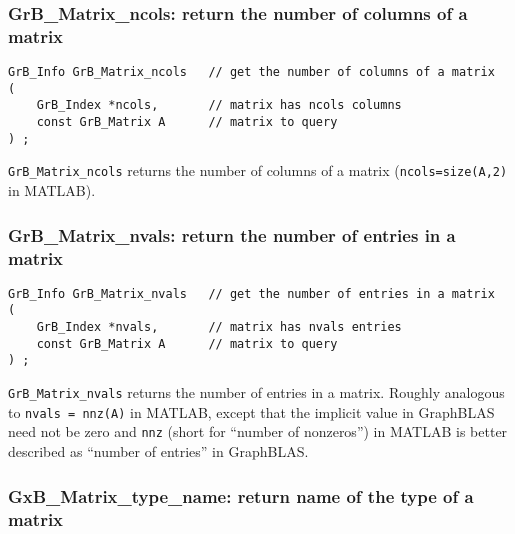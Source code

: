 \documentclass[12pt]{article}
\begin{document}
\subsubsection{{\sf GrB\_Matrix\_ncols:}        return the number of columns of a matrix}
\label{matrix_ncols}

\begin{mdframed}[userdefinedwidth=6in]
{\footnotesize
\begin{verbatim}
GrB_Info GrB_Matrix_ncols   // get the number of columns of a matrix
(
    GrB_Index *ncols,       // matrix has ncols columns
    const GrB_Matrix A      // matrix to query
) ;
\end{verbatim}
} \end{mdframed}

\verb'GrB_Matrix_ncols' returns the number of columns of a matrix
(\verb'ncols=size(A,2)' in MATLAB).

\subsubsection{{\sf GrB\_Matrix\_nvals:}        return the number of entries in a matrix}
\label{matrix_nvals}

\begin{mdframed}[userdefinedwidth=6in]
{\footnotesize
\begin{verbatim}
GrB_Info GrB_Matrix_nvals   // get the number of entries in a matrix
(
    GrB_Index *nvals,       // matrix has nvals entries
    const GrB_Matrix A      // matrix to query
) ;
\end{verbatim} } \end{mdframed}

\verb'GrB_Matrix_nvals' returns the number of entries in a matrix.  Roughly
analogous to \verb'nvals = nnz(A)' in MATLAB, except that the implicit value in
GraphBLAS need not be zero and \verb'nnz' (short for ``number of nonzeros'') in
MATLAB is better described as ``number of entries'' in GraphBLAS.

\subsubsection{{\sf GxB\_Matrix\_type\_name:} return name of the type of a matrix}
\label{matrix_type_name}
\end{document}
